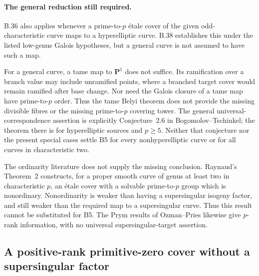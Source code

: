 \documentclass[11pt,a4paper]{article}
\begin{document}
\paragraph{The general reduction still required.}
B.36 also applies whenever a prime-to-$p$ \'etale cover of the
given odd-characteristic curve maps to a hyperelliptic curve.
B.38 establishes this under the listed low-genus Galois
hypotheses, but a general curve is not assumed to have such a map.

For a general curve, a tame map to $\mathbf P^1$ does not suffice.
Its ramification over a branch value may include unramified points,
where a branched target cover would remain ramified after base
change. Nor need the Galois closure of a tame map have
prime-to-$p$ order. Thus the tame Belyi theorem does not provide
the missing divisible fibres or the missing prime-to-$p$ covering
tower. The general universal-correspondence assertion is explicitly
Conjecture~2.6 in Bogomolov--Tschinkel; the theorem there is for
hyperelliptic sources and $p\ge5$. Neither that conjecture nor the
present special cases settle B5 for every nonhyperelliptic curve
or for all curves in characteristic two.
\citep[Theorem~1.7 and \S3]{LA_Poonen2005}
\citep[Theorem~1.7 and Conjecture~2.6]{LA_BogomolovTschinkel2002}
\citep[Theorem~1.5]{LA_KedlayaLittWitaszek2023}

The ordinarity literature does not supply the missing conclusion.
Raynaud's Theorem~2 constructs, for a proper smooth curve of genus
at least two in characteristic $p$, an \'etale cover with a solvable
prime-to-$p$ group which is nonordinary. Nonordinarity is weaker than
having a supersingular isogeny factor, and still weaker than the
required map to a supersingular curve. Thus this result cannot be
substituted for B5. The Prym results of Ozman--Pries likewise give
$p$-rank information, with no universal supersingular-target assertion.
\citep[Theorem~2]{LA_Raynaud2000}
\citep[Theorem~1.1 and \S8.2]{LA_OzmanPries2019}


\subsection{A positive-rank primitive-zero cover without a supersingular factor}
\end{document}

